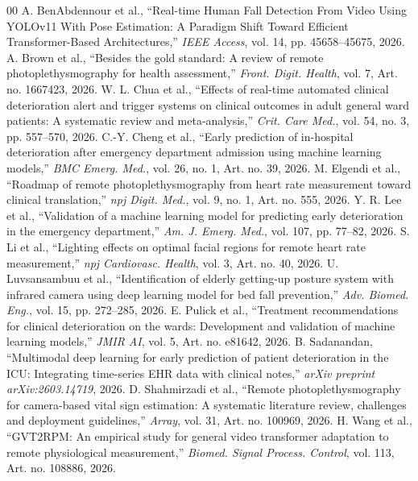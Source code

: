\documentclass[conference]{IEEEtran}
\begin{document}
\balance
\begin{thebibliography}{00}
\setlength{\itemsep}{0pt}
\setlength{\parskip}{0pt}
 A. BenAbdennour et al., ``Real-time Human Fall Detection From Video Using YOLOv11 With Pose Estimation: A Paradigm Shift Toward Efficient Transformer-Based Architectures,'' \emph{IEEE Access}, vol. 14, pp. 45658--45675, 2026.
 A. Brown et al., ``Besides the gold standard: A review of remote photoplethysmography for health assessment,'' \emph{Front. Digit. Health}, vol. 7, Art. no. 1667423, 2026.
 W. L. Chua et al., ``Effects of real-time automated clinical deterioration alert and trigger systems on clinical outcomes in adult general ward patients: A systematic review and meta-analysis,'' \emph{Crit. Care Med.}, vol. 54, no. 3, pp. 557--570, 2026.
 C.-Y. Cheng et al., ``Early prediction of in-hospital deterioration after emergency department admission using machine learning models,'' \emph{BMC Emerg. Med.}, vol. 26, no. 1, Art. no. 39, 2026.
 M. Elgendi et al., ``Roadmap of remote photoplethysmography from heart rate measurement toward clinical translation,'' \emph{npj Digit. Med.}, vol. 9, no. 1, Art. no. 555, 2026.
 Y. R. Lee et al., ``Validation of a machine learning model for predicting early deterioration in the emergency department,'' \emph{Am. J. Emerg. Med.}, vol. 107, pp. 77--82, 2026.
 S. Li et al., ``Lighting effects on optimal facial regions for remote heart rate measurement,'' \emph{npj Cardiovasc. Health}, vol. 3, Art. no. 40, 2026.
 U. Luvsansambuu et al., ``Identification of elderly getting-up posture system with infrared camera using deep learning model for bed fall prevention,'' \emph{Adv. Biomed. Eng.}, vol. 15, pp. 272--285, 2026.
 E. Pulick et al., ``Treatment recommendations for clinical deterioration on the wards: Development and validation of machine learning models,'' \emph{JMIR AI}, vol. 5, Art. no. e81642, 2026.
 B. Sadanandan, ``Multimodal deep learning for early prediction of patient deterioration in the ICU: Integrating time-series EHR data with clinical notes,'' \emph{arXiv preprint arXiv:2603.14719}, 2026.
 D. Shahmirzadi et al., ``Remote photoplethysmography for camera-based vital sign estimation: A systematic literature review, challenges and deployment guidelines,'' \emph{Array}, vol. 31, Art. no. 100969, 2026.
 H. Wang et al., ``GVT2RPM: An empirical study for general video transformer adaptation to remote physiological measurement,'' \emph{Biomed. Signal Process. Control}, vol. 113, Art. no. 108886, 2026.

\end{thebibliography}
\end{document}
